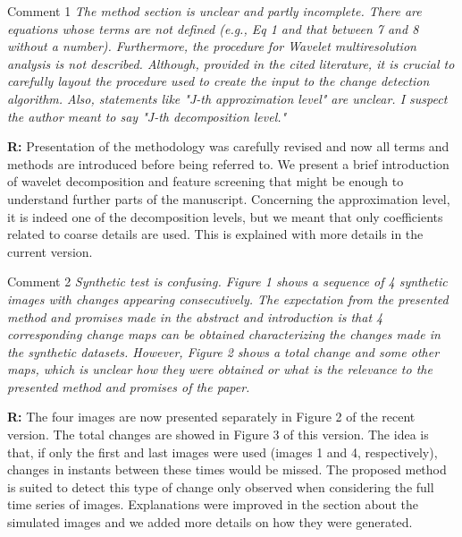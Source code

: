 \documentclass[11pt]{report}
\begin{document}
\medskip
\begin{mybox}{Comment 1}
\textit{The method section is unclear and partly incomplete. There are equations whose terms are not defined (e.g., Eq 1 and
that between 7 and 8 without a number). Furthermore, the procedure for Wavelet multiresolution analysis is not
described. Although, provided in the cited literature, it is crucial to carefully layout the procedure used to create the input
to the change detection algorithm. Also, statements like "J-th approximation level" are unclear. I suspect the author
meant to say "J-th decomposition level."}


\medskip
\textbf{R:} Presentation of the methodology was carefully revised and now all terms and methods are introduced before being referred to. We present a brief introduction of wavelet decomposition and feature screening that might be enough to understand further parts of the manuscript. Concerning the approximation level, it is indeed one of the decomposition levels, but we meant that only coefficients related to coarse details are used. This is explained with more details in the current version.
\end{mybox}

\medskip


\begin{mybox}{Comment 2}
\textit{Synthetic test is confusing. Figure 1 shows a sequence of 4 synthetic images with changes appearing consecutively.
The expectation from the presented method and promises made in the abstract and introduction is that 4 corresponding
change maps can be obtained characterizing the changes made in the synthetic datasets. However, Figure 2 shows a
total change and some other maps, which is unclear how they were obtained or what is the relevance to the presented
method and promises of the paper.}

\medskip

\textbf{R:} The four images are now presented separately in Figure 2 of the recent version. The total changes are showed in Figure 3 of this version. The idea is that, if only the first and last images were used (images 1 and 4, respectively), changes in instants between these times would be missed. The proposed method is suited to detect this type of change only observed when considering the full time series of images. Explanations were improved in the section about the simulated images and we added more details on how they were generated.
\end{mybox}
\end{document}
